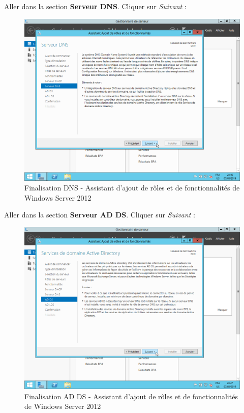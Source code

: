 \newpage
Aller dans la section \textbf{Serveur DNS}. Cliquer sur \textit{Suivant} :
\begin{figure}[h!]
    \begin{center}
        \includegraphics[scale=0.6]{WS2012_Screenshots/28.png}
        \caption{Finalisation DNS - Assistant d'ajout de rôles et de fonctionnalités de Windows Server 2012}
        \label{WS2012_Screenshots/28}
    \end{center}
\end{figure}
\FloatBarrier

\newpage
Aller dans la section \textbf{Serveur AD DS}. Cliquer sur \textit{Suivant} :
\begin{figure}[h!]
    \begin{center}
        \includegraphics[scale=0.6]{WS2012_Screenshots/29.png}
        \caption{Finalisation AD DS - Assistant d'ajout de rôles et de fonctionnalités de Windows Server 2012}
        \label{WS2012_Screenshots/29}
    \end{center}
\end{figure}
\FloatBarrier


